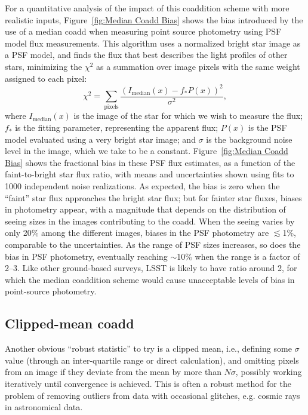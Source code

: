 \documentclass{openjournal}
\newcommand{\irresponse}[1]{{#1}}
\begin{document}
For a quantitative analysis of the impact of this coaddition scheme with more realistic inputs, Figure~\ref{fig:Median Coadd Bias} shows the bias introduced by the use of a median coadd when measuring point source photometry using PSF model flux measurements.
This algorithm uses a normalized bright star image as a PSF model, and finds the flux that best  describes the light profiles of other stars, minimizing the $\chi^2$ as a summation over image pixels with the same weight assigned to each pixel:
\begin{equation}
\chi^2 = \sum_\text{pixels} \frac{(I_\text{median}(x)-f_*P(x))^2}{\sigma^2},
\end{equation} 
where \irresponse{$I_\text{median}(x)$} is the image of the star for which we wish to measure the flux; $f_*$ is the fitting parameter, representing the apparent flux; $P(x)$ is the PSF model evaluated using a very bright star image; and  $\sigma$ is the background noise level in the image, which we take to be a constant.   Figure~\ref{fig:Median Coadd Bias} shows the fractional bias in these PSF flux estimates, as a function of the faint-to-bright star flux ratio, with means and uncertainties shown using fits to 1000 independent noise realizations.  
As expected, the bias is zero when the ``faint'' star flux approaches the bright star flux; but for fainter star fluxes,  biases in photometry appear, with a magnitude that depends on the distribution of seeing sizes in the images contributing to the coadd. When the seeing varies by only 20\% among the different images, biases in the PSF photometry are $\lesssim$1\%, comparable to the uncertainties. As the range of PSF sizes increases, so does the bias in PSF photometry, eventually reaching $\sim$10\% when the range is a factor of 2--3. Like other ground-based surveys, LSST is likely to have ratio around 2, for which the median coaddition scheme would cause unacceptable levels of bias in point-source photometry.


\subsection{Clipped-mean coadd}

Another obvious ``robust statistic'' to try is a clipped mean, i.e., defining some $\sigma$ value (through an \irresponse{inter-quartile range} or direct calculation), and omitting pixels from an image if they deviate from the mean by more than $N\sigma$, possibly working iteratively until convergence is achieved.
\irresponse{This is often a robust method for the problem of removing outliers from data with occasional glitches, e.g. cosmic rays in astronomical data.}
\end{document}
